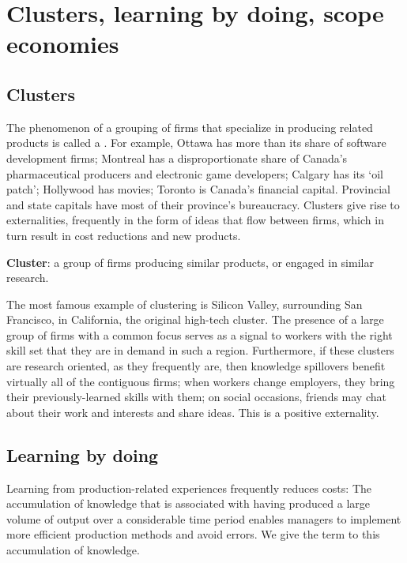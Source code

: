 \section{Clusters, learning by doing, scope economies}\label{sec:ch8sec8}

\subsection*{Clusters}

The phenomenon of a grouping of firms that specialize in producing related
products is called a . For example, Ottawa has more
than its share of software development firms; Montreal has a
disproportionate share of Canada's pharmaceutical producers and electronic
game developers; Calgary has its `oil patch'; Hollywood has movies; Toronto
is Canada's financial capital. Provincial and state capitals have most of
their province's bureaucracy. Clusters give rise to externalities,
frequently in the form of ideas that flow between firms, which in turn
result in cost reductions and new products.

\begin{DefBox}
	\textbf{Cluster}: a group of firms producing similar products, or engaged in similar research.
\end{DefBox}

The most famous example of clustering is Silicon Valley, surrounding San
Francisco, in California, the original high-tech cluster. The presence of a
large group of firms with a common focus serves as a signal to workers with
the right skill set that they are in demand in such a region. Furthermore,
if these clusters are research oriented, as they frequently are, then
knowledge spillovers benefit virtually all of the contiguous firms; when
workers change employers, they bring their previously-learned skills with
them; on social occasions, friends may chat about their work and interests
and share ideas. This is a positive externality.

\newhtmlpage

\subsection*{Learning by doing}

Learning from production-related experiences frequently reduces costs: The
accumulation of knowledge that is associated with having produced a large
volume of output over a considerable time period enables managers to
implement more efficient production methods and avoid errors. We give the
term  to this accumulation of knowledge.

